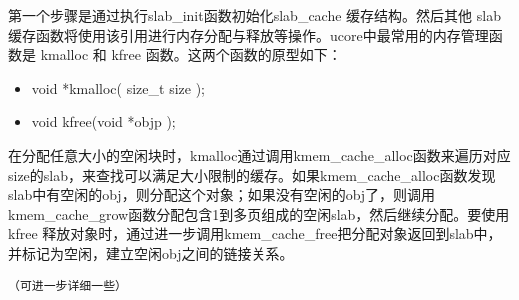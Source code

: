第一个步骤是通过执行slab\_init函数初始化slab\_cache 缓存结构。然后其他
slab
缓存函数将使用该引用进行内存分配与释放等操作。ucore中最常用的内存管理函数是
kmalloc 和 kfree 函数。这两个函数的原型如下：

\begin{itemize}
\tightlist
\item
  void *kmalloc( size\_t size );
\item
  void kfree(void *objp );
\end{itemize}

在分配任意大小的空闲块时，kmalloc通过调用kmem\_cache\_alloc函数来遍历对应size的slab，来查找可以满足大小限制的缓存。如果kmem\_cache\_alloc函数发现slab中有空闲的obj，则分配这个对象；如果没有空闲的obj了，则调用kmem\_cache\_grow函数分配包含1到多页组成的空闲slab，然后继续分配。要使用
kfree
释放对象时，通过进一步调用kmem\_cache\_free把分配对象返回到slab中，并标记为空闲，建立空闲obj之间的链接关系。

\lstinline!（可进一步详细一些）!
